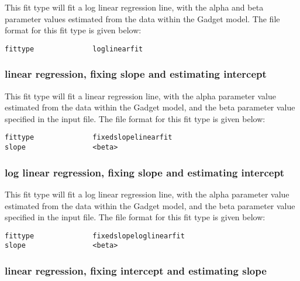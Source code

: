 \documentclass[]{book}
\begin{document}
This fit type will fit a log linear regression line, with the alpha and
beta parameter values estimated from the data within the Gadget model.
The file format for this fit type is given below:

\begin{verbatim}
fittype              loglinearfit
\end{verbatim}

\hypertarget{linear-regression-fixing-slope-and-estimating-intercept}{%
\subsubsection{linear regression, fixing slope and estimating intercept}\label{linear-regression-fixing-slope-and-estimating-intercept}}

This fit type will fit a linear regression line, with the alpha
parameter value estimated from the data within the Gadget model, and the
beta parameter value specified in the input file. The file format for
this fit type is given below:

\begin{verbatim}
fittype              fixedslopelinearfit
slope                <beta>
\end{verbatim}

\hypertarget{log-linear-regression-fixing-slope-and-estimating-intercept}{%
\subsubsection{log linear regression, fixing slope and estimating intercept}\label{log-linear-regression-fixing-slope-and-estimating-intercept}}

This fit type will fit a log linear regression line, with the alpha
parameter value estimated from the data within the Gadget model, and the
beta parameter value specified in the input file. The file format for
this fit type is given below:

\begin{verbatim}
fittype              fixedslopeloglinearfit
slope                <beta>
\end{verbatim}

\hypertarget{linear-regression-fixing-intercept-and-estimating-slope}{%
\subsubsection{linear regression, fixing intercept and estimating slope}\label{linear-regression-fixing-intercept-and-estimating-slope}}
\end{document}
